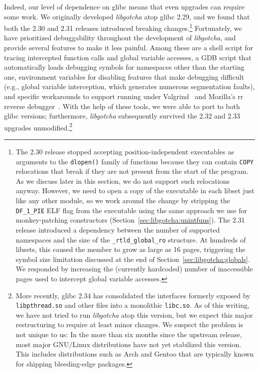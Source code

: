 Indeed, our level of dependence on glibc means that even upgrades can require some
work.  We originally developed \textit{libgotcha} atop glibc 2.29, and we found that
both the 2.30 and 2.31 releases introduced breaking changes.\footnote{The 2.30
release stopped accepting position-independent executables as arguments to the
\texttt{dlopen()} family of functions because they can contain \texttt{COPY}
relocations that break if they are not present from the start of the program.  As we
discuss later in this section, we do not support such relocations anyway.  However,
we need to open a copy of the executable in each libset just like any other module,
so we work around the change by stripping the \texttt{DF\_1\_PIE} ELF flag from the
executable using the same approach we use for monkey-patching constructors
(Section~\ref{sec:libgotcha:unintfuns}).  The 2.31 release introduced a dependency
between the number of supported namespaces and the size of the
\texttt{\_rtld\_global\_ro} structure.  At hundreds of libsets, this caused the
member to grow as large as 16 pages, triggering the symbol size limitation discussed
at the end of Section~\ref{sec:libgotcha:globals}.  We responded by increasing the
(currently hardcoded) number of inaccessible pages used to intercept global variable
accesses.}  Fortunately, we have prioritized debuggability throughout the development
of \textit{libgotcha}, and provide several features to make it less painful.  Among
these are a shell script for tracing intercepted function calls and global variable
accesses, a GDB script that automatically loads debugging symbols for namespaces
other than the starting one, environment variables for disabling features that make
debugging difficult (e.g., global variable interception, which generates numerous
segmentation faults), and specific workarounds to support running under
Valgrind~\cite{seward:usenix2005} and Mozilla's rr reverse
debugger~\cite{callahan:arxiv2017}.  With the help of these tools, we were able to
port to both glibc versions; furthermore, \textit{libgotcha} subsequently survived
the 2.32 and 2.33 upgrades unmodified.\footnote{More recently, glibc 2.34 has
consolidated the interfaces formerly exposed by \texttt{libpthread.so} and other
files into a monolithic \texttt{libc.so}.  As of this writing, we have not tried to
run \textit{libgotcha} atop this version, but we expect this major restructuring to
require at least minor changes.  We suspect the problem is not unique to us:  In the
more than six months since the upstream release, most major GNU/Linux distributions
have not yet stabilized this version.  This includes distributions such as Arch and
Gentoo that are typically known for shipping bleeding-edge packages.}


